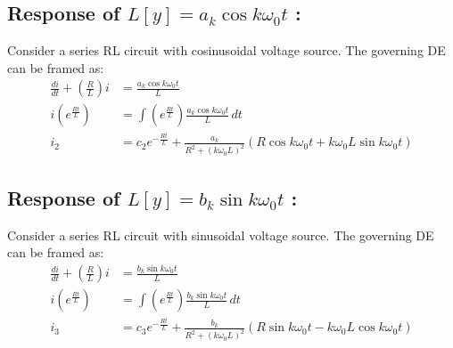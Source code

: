 \documentclass[journal]{IEEEtran}
\begin{document}
\subsection{\textbf{Response of $L[y] = a_{k} \cos{k \omega_{0} t}$} : }
Consider a series RL circuit with cosinusoidal voltage source. The governing DE can be framed as:
\begin{align*}
	\frac{di}{dt} + \left(\frac{R}{L}\right) i &= \frac{a_{k} \cos{k \omega_{0} t}}{L} \\
	i \left(e^{\frac{Rt}{L}}\right) &= \int \left(e^{\frac{Rt}{L}}\right) \frac{a_{k} \cos{k \omega_{0} t}}{L} \, dt \nonumber \\
	i_2 &= c_2 e^{-\frac{Rt}{L}} + \frac{a_{k}}{R^2 + (k \omega_{0} L)^2} \left(R \cos{k \omega_{0} t} + k \omega_{0} L \sin{k \omega_{0} t}\right) \label{eq:i2}
\end{align*}

\subsection{\textbf{Response of $L[y] = b_{k} \sin{k \omega_{0} t}$} : }
Consider a series RL circuit with sinusoidal voltage source. The governing DE can be framed as:
\begin{align*}
	\frac{di}{dt} + \left(\frac{R}{L}\right) i &= \frac{b_{k} \sin{k \omega_{0} t}}{L} \\
	i \left(e^{\frac{Rt}{L}}\right) &= \int \left(e^{\frac{Rt}{L}}\right) \frac{b_{k} \sin{k \omega_{0} t}}{L} \, dt \nonumber \\
	i_3 &= c_3 e^{-\frac{Rt}{L}} + \frac{b_{k}}{R^2 + (k \omega_{0} L)^2} \left(R \sin{k \omega_{0} t} - k \omega_{0} L \cos{k \omega_{0} t}\right) \label{eq:i3}
\end{align*}
\end{document}
